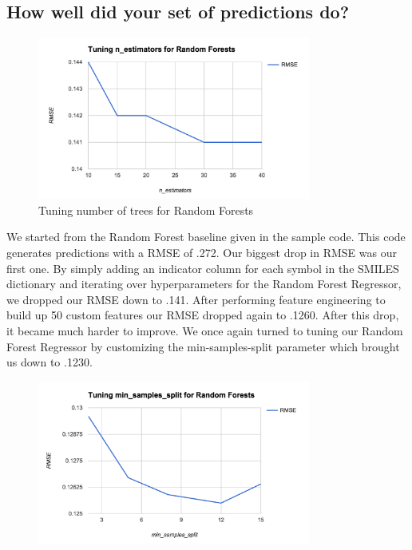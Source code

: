 \documentclass[]{article}
\begin{document}
\subsection*{How well did your set of predictions do?}
\begin{flushleft}
	\begin{figure}[h]
		\centering
		\includegraphics[width=0.8\textwidth]{n_estimators}
		\caption{Tuning number of trees for Random Forests}
	\end{figure}
	We started from the Random Forest baseline given in the sample code.  This code generates predictions with a RMSE of .272.  Our biggest drop in RMSE was our first one.  By simply adding an indicator column for each symbol in the SMILES dictionary and iterating over hyperparameters for the Random Forest Regressor, we dropped our RMSE down to .141.
	\newline\newline
	After performing feature engineering to build up 50 custom features our RMSE dropped again to .1260. After this drop, it became much harder to improve.  We once again turned to tuning our Random Forest Regressor by customizing the min-samples-split parameter which brought us down to .1230.
	\newline\newline
	\begin{figure}[h]
		\centering
		\includegraphics[width=0.8\textwidth]{min_samples_split}

\end{figure}
\end{flushleft}
\end{document}

